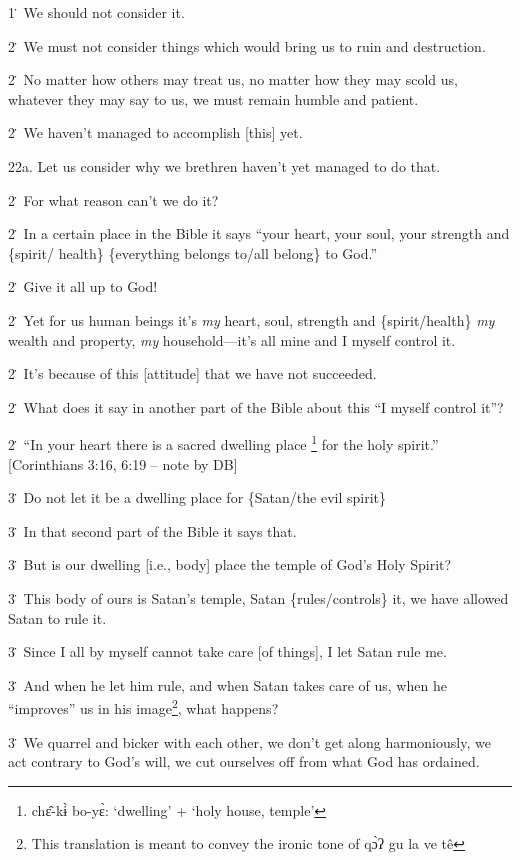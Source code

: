 1\. We should not consider it.

2\. We must not consider things which would bring us to ruin and destruction.

2\. No matter how others may treat us, no matter how they may scold us, whatever
they may say to us, we must remain humble and patient.

2\. We haven't managed to accomplish [this] yet.

22a. Let us consider why we brethren haven't yet managed to do that.

2\. For what reason can't we do it?

2\. In a certain place in the Bible it says ``your heart, your soul, your strength
and \{spirit/ health\} \{everything belongs to/all belong\} to God.''

2\. Give it all up to God!

2\. Yet for us human beings it's \textit{my} heart, soul, strength and \{spirit/health\}
\textit{my} wealth and property, \textit{my }household---it's all mine and I myself
control it.

2\. It's because of this [attitude] that we have not succeeded.

2\. What does it say in another part of the Bible about this ``I myself control
it''?

2\. ``In your heart there is a sacred dwelling place \footnote{chɛ̂-kɨ̀ bo-yɛ̀: `dwelling' + `holy house, temple'} for the holy spirit.''
[Corinthians 3:16, 6:19 -- note by DB]

3\. Do not let it be a dwelling place for \{Satan/the evil spirit\}

3\. In that second part of the Bible it says that.

3\. But is our dwelling [i.e., body] place the temple of God's Holy Spirit?

3\. This body of ours is Satan's temple, Satan \{rules/controls\} it, we have allowed
Satan to rule it.

3\. Since I all by myself cannot take care [of things], I let Satan rule me.

3\. And when he let him rule, and when Satan takes care of us, when he ``improves''
us in his image\footnote{This translation is meant to convey the ironic tone of qɔ̀ʔ gu la ve tê}, what happens?

3\. We quarrel and bicker with each other, we don't get along harmoniously, we
act contrary to God's will, we cut ourselves off from what God has ordained.

